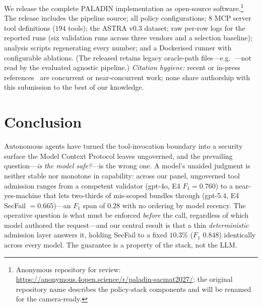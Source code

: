 \documentclass[sigconf,review,anonymous]{acmart}
\begin{document}
We release the complete PALADIN implementation as open-source software.\footnote{Anonymous repository for review: \url{https://anonymous.4open.science/r/paladin-sacmat2027/}; the original repository name describes the policy-stack components and will be renamed for the camera-ready.} The release includes the pipeline source; all policy configurations; 8 MCP server tool definitions ($194$ tools); the ASTRA v0.3 dataset; raw per-row logs for the reported runs (six validation runs across three vendors and a selection baseline); analysis scripts regenerating every number; and a Dockerised runner with configurable ablations. (The released  retains legacy oracle-path files---e.g.\ ---not read by the evaluated agnostic pipeline.) \emph{Citation hygiene:} recent or in-press references~\cite{gupta2025security,jamshidi2025securing,chu2026stateless,patil2026sentinelagent,rampalli2026pedigree} are concurrent or near-concurrent work; none share authorship with this submission to the best of our knowledge.

\section{Conclusion}
\label{sec:conclusion}

Autonomous agents have turned the tool-invocation boundary into a security surface the Model Context Protocol leaves ungoverned, and the prevailing question---\emph{is the model safe?}---is the wrong one. A model's unaided judgment is neither stable nor monotone in capability: across our panel, ungoverned tool admission ranges from a competent validator (gpt-4o, E4 $F_1=0.760$) to a near-yes-machine that lets two-thirds of mis-scoped bundles through (gpt-5.4, E4 SecFail $=0.665$)---an $F_1$ span of $0.28$ with no ordering by model recency. The operative question is what must be enforced \emph{before} the call, regardless of which model authored the request---and our central result is that a thin \emph{deterministic} admission layer answers it, holding SecFail to a fixed $10.3\%$ ($F_1$ $0.848$) identically across every model. The guarantee is a property of the stack, not the LLM.
\end{document}
